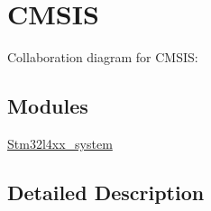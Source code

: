 \hypertarget{group__CMSIS}{}\section{C\+M\+S\+IS}
\label{group__CMSIS}
Collaboration diagram for C\+M\+S\+IS\+:
\subsection*{Modules}
\begin{DoxyCompactItemize}
\item 
\hyperlink{group__stm32l4xx__system}{Stm32l4xx\+\_\+system}
\end{DoxyCompactItemize}


\subsection{Detailed Description}
